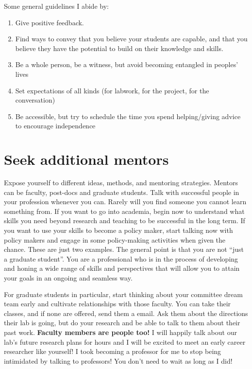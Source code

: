 \documentclass[12pt]{article}
\begin{document}
Some general guidelines I abide by:
\begin{enumerate}
\item Give positive feedback.
\item Find ways to convey that you believe your students are capable,
  and that you believe they have the potential to build on their
  knowledge and skills.
\item Be a whole person, be a witness, but avoid becoming entangled in
  peoples' lives
\item Set expectations of all kinds (for labwork, for the project, for
  the conversation)
\item Be accessible, but try to schedule the time you spend
  helping/giving advice to encourage independence
\end{enumerate}

\section{Seek additional mentors}
\label{sec:mentors}
Expose yourself to different ideas, methods, and mentoring
strategies. Mentors can be faculty, post-docs and graduate
students. Talk with successful people in your profession whenever you
can. Rarely will you find someone you cannot learn something from. If
you want to go into academia, begin now to understand what skills you
need beyond research and teaching to be successful in the long term. If
you want to use your skills to become a policy maker, start talking
now with policy makers and engage in some policy-making activities
when given the chance. These are just two examples. The general point
is that you are not ``just a graduate student''. You are a
professional who is in the process of developing and honing a wide
range of skills and perspectives that will allow you to attain your
goals in an ongoing and seamless way.

For graduate students in particular, start thinking about your
committee dream team early and cultivate relationships with those
faculty. You can take their classes, and if none are offered, send
them a email. Ask them about the directions their lab is going, but do
your research and be able to talk to them about their past
work. \textbf{Faculty members are people too!} I will happily talk
about our lab's future research plans for hours and I will be excited
to meet an early career researcher like yourself! I took becoming a
professor for me to stop being intimidated by talking to professors!
You don't need to wait as long as I did!
\end{document}
